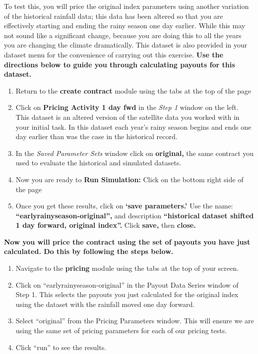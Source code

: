 \documentclass[letterpaper,10pt,english]{sphinxmanual}
\begin{document}
To test this, you will price the original index parameters using another variation of the historical rainfall data; this data has been altered so that you are effectively starting and ending the rainy season one day earlier. While this may not sound like a significant change, because you are doing this to all the years you are changing the climate dramatically. This dataset is also provided in your dataset menu for the convenience of carrying out this exercise.  \textbf{Use the directions below to guide you through calculating payouts for this dataset.}
\begin{enumerate}
\item {} 
Return to the \textbf{create contract} module using the tabs at the top of the page

\item {} 
Click on \textbf{Pricing Activity 1 day fwd} in the \emph{Step 1} window on the left.  This dataset is an altered version of the satellite data you worked with in your initial task. In this dataset each year's rainy season begins and ends one day earlier than was the case in the historical record.

\item {} 
In the \emph{Saved Parameter Sets} window click on \textbf{original,} the same contract you used to evaluate the historical and simulated datasets.

\item {} 
Now you are ready to \textbf{Run Simulation:} Click on the bottom right side of the page

\item {} 
Once you get these results, click on \textbf{`save parameters.'} Use the name: \textbf{``earlyrainyseason-original'',} and description \textbf{``historical dataset shifted 1 day forward, original index''.} Click \textbf{save,} then \textbf{close.}

\end{enumerate}

\textbf{Now you will price the contract using the set of payouts you have just calculated.  Do this by following the steps below.}
\begin{enumerate}
\item {} 
Navigate to the \textbf{pricing} module using the tabs at the top of your screen.

\item {} 
Click on ``earlyrainyseason-original'' in the Payout Data Series window of Step 1.  This selects the payouts you just calculated for the original index using the dataset with the rainfall moved one day forward.

\item {} 
Select ``original'' from the Pricing Parameters window.  This will ensure we are using the same set of pricing parameters for each of our pricing tests.

\item {} 
Click ``run'' to see the results.

\end{enumerate}
\end{document}
